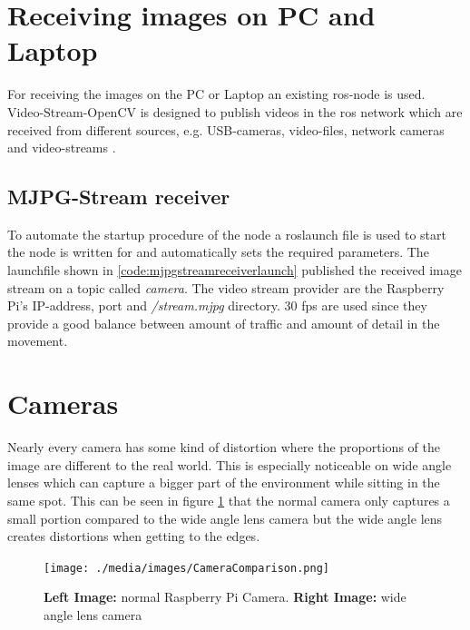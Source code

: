 \section{Receiving images on PC and Laptop\authorA}
For receiving the images on the PC or Laptop an existing \gls{ros}-node is used. Video-Stream-OpenCV is designed to publish videos in the \gls{ros} network which are received from different sources, e.g. USB-cameras, video-files, network cameras and video-streams \cite{videostreamopencv}.

\subsection{MJPG-Stream receiver}
To automate the startup procedure of the node a roslaunch file is used to start the node is written for and automatically sets the required parameters.\newline
The launchfile shown in \ref{code:mjpgstreamreceiverlaunch} published the received image stream on a topic called \textit{camera}. The video stream provider are the Raspberry Pi's IP-address, port and \textit{/stream.mjpg} directory. 30 \gls{fps} are used since they provide a good balance between amount of traffic and amount of detail in the movement.


\section{Cameras\authorA}
Nearly every camera has some kind of distortion where the proportions of the image are different to the real world. This is especially noticeable on wide angle lenses which can capture a bigger part of the environment while sitting in the same spot. This can be seen in figure \ref{cameracomparison} that the normal camera only captures a small portion compared to the wide angle lens camera but the wide angle lens creates distortions when getting to the edges.
\begin{figure}[h]
	\centering
	\texttt{[image: ./media/images/CameraComparison.png]}
  	\caption{\textbf{Left Image:} normal Raspberry Pi Camera. \textbf{Right Image:} wide angle lens camera}
  	\label{cameracomparison}
\end{figure}

